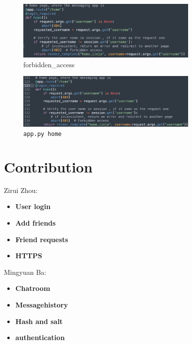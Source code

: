 \documentclass[12pt]{article}
\begin{document}
        \begin{figure}[H]
            \centering
            \includegraphics[width=0.8\textwidth]{graphs/forbidden_access.jpg}
            \caption{forbidden\_access}
            \label{forbidden access}{}
        \end{figure}


        \begin{figure}[H]
            \centering
            \includegraphics[width=0.8\textwidth]{graphs/home_session.jpg}
            \caption{\texttt{app.py home}}
            \label{home session}
        \end{figure}

\section{Contribution}

 Zirui Zhou:  
\begin{itemize}
\item \textbf{User login}
\item \textbf{Add friends}
\item \textbf{Friend requests}
\item \textbf{HTTPS}
\end{itemize}



\noindent Mingyuan Ba:
\begin{itemize}
\item \textbf{Chatroom}
\item \textbf{Messagehistory}
\item \textbf{Hash and salt}
\item \textbf{authentication}
\end{itemize}

       
\end{document}

